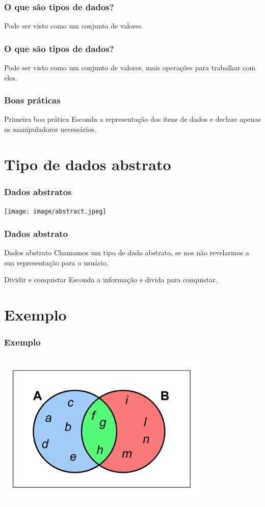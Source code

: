 \documentclass{beamer}
\begin{document}
\begin{frame}
  \frametitle{O que são tipos de dados?}
  Pode ser visto como um conjunto de valores.
\end{frame}

\begin{frame}
  \frametitle{O que são tipos de dados?}
  Pode ser visto como um conjunto de valores, mais operações para trabalhar 
  com eles.
\end{frame}

\begin{frame}
 \frametitle{Boas práticas}
 \begin{block}{Primeira boa prática}
  Esconda a representação dos itens de dados e declare apenas os manipuladores 
  necessários.
 \end{block}
\end{frame}

\section{Tipo de dados abstrato}

\begin{frame}
  \frametitle{Dados abstratos}
  \texttt{[image: image/abstract.jpeg]}
\end{frame}

\begin{frame}
 \frametitle{Dados abstrato}
 \begin{block}{Dados abstrato}
  Chamamos um tipo de dado abstrato, se nos não revelarmos a sua representação 
  para o usuário.
 \end{block}

 \begin{block}{Dividir e conquistar}
  Esconda a informação e divida para conquistar.
 \end{block}
\end{frame}

\section{Exemplo}
\begin{frame}
  \frametitle{Exemplo}
  \includegraphics[height = 3in, width = 4in]{image/set.jpg}
\end{frame}
\end{document}
